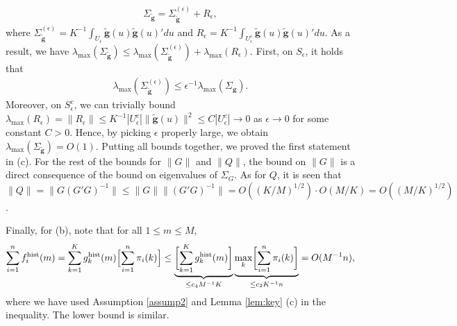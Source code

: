 \documentclass[preprint,11pt]{article}
\newcommand{\zy}[1]{{\color{red}\bf[ZY: #1]}}
\numberwithin{equation}{section}
\begin{document}
\begin{align*}
    \Sigma_{\tilde{\bm{g}}}=\Sigma_{\tilde{\bm{g}}}^{(\epsilon)}+R_{\epsilon},
\end{align*}
where $\Sigma_{\tilde{\bm{g}}}^{(\epsilon)}=K^{-1}\int_{U_\epsilon}\bm{\tilde{g}}(u)\bm{\tilde{g}}(u)'du$ and $R_\epsilon=K^{-1}\int_{U_\epsilon^c}\bm{\tilde{g}}(u)\bm{\tilde{g}}(u)'du$. As a result, we have $\lambda_{\max}(\Sigma_{\tilde{\bm{g}}})\le \lambda_{\max}(\Sigma_{\tilde{\bm{g}}}^{(\epsilon)})+\lambda_{\max}(R_\epsilon)$. First, on $S_\epsilon$, it holds that
\begin{align*}
    \lambda_{\max}(\Sigma_{\tilde{\bm{g}}}^{(\epsilon)})\le \epsilon^{-1}\lambda_{\max}(\Sigma_{\bm{g}}).
\end{align*}
Moreover, on $S_\epsilon^c$, we can trivially bound $\lambda_{\max}(R_\epsilon)=\|R_\epsilon\|\le K^{-1}|U_\epsilon^c|\|\tilde{\bm{g}}(u)\|^2\le C|U_\epsilon^c|\rightarrow 0$ as $\epsilon\rightarrow 0$ for some constant $C>0$. Hence, by picking $\epsilon$ properly large, we obtain $\lambda_{\max}(\Sigma_{\tilde{\bm{g}}})=O(1)$. Putting all bounds together, we proved the first statement in (c). For the rest of the bounds for $\|G\|$ and $\|Q\|$, the bound on $\|G\|$ is a direct consequence of the bound on eigenvalues of $\Sigma_G$. As for $Q$, it is seen that $\|Q\|=\|G(G'G)^{-1}\|\le \|G\|\|(G'G)^{-1}\|=O((K/M)^{1/2})\cdot O(M/K)=O((M/K)^{1/2})$.

Finally, for (b), note that for all $1\le m\le M$,
\[
\sum_{i=1}^n f_i^{\text{hist}}(m)  = \sum_{k=1}^K g_k^{\text{hist}}(m)\Bigl[ \sum_{i=1}^n \pi_i(k)\Bigr]\leq \underbrace{\biggl[\sum_{k=1}^K g_k^{\text{hist}}(m)
\biggr]}_{\leq c_4M^{-1}K}\underbrace{\max_{k}\biggl[ \sum_{i=1}^n \pi_i(k)\biggr]}_{\leq c_2K^{-1}n} =O(M^{-1}n),
\]
where we have used Assumption \ref{assump2} and Lemma \ref{lem:key} (c) in the inequality. The lower bound is similar.

\end{document}
